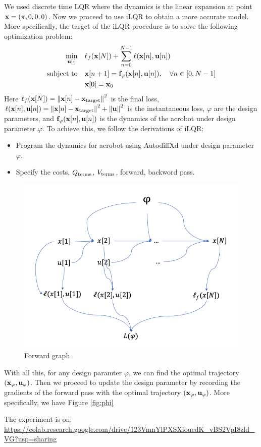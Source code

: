 \documentclass{article}
\begin{document}
We used discrete time LQR where the dynamics is the linear expansion at point $\mathbf{x} = (\pi,0,0,0)$. Now we proceed to use iLQR to obtain a more accurate model. More specifically, the target of the iLQR procedure is to solve the following optimization problem:
\begin{align*} \min_{\mathbf{u}[\cdot]} \quad & \ell_f(\mathbf{x}[N]) +
    \sum_{n=0}^{N-1} \ell(\mathbf{x}[n],\mathbf{u}[n]) \\ \text{subject to} \quad & \mathbf{x}[n+1] = {\bf
    f_\varphi}(\mathbf{x}[n], \mathbf{u}[n]), \quad \forall n\in[0, N-1] \\ & \mathbf{x}[0] = \mathbf{x}_0
\end{align*}
Here $\ell_f(\mathbf{x}[N]) = \left\|{\mathbf{x}[n] - \mathbf{x}_{\rm target}}\right\|^2$ is the final loss, $\ell(\mathbf{x}[n],\mathbf{u}[n]) = \left\|{\mathbf{x}[n] - \mathbf{x}_{\rm target}}\right\|^2 + \left\|{\mathbf{u}}\right\|^2$ is the instantaneous loss, $\varphi$ are the design parameters, and $\mathbf{f}_\varphi(\mathbf{x}[n],\mathbf{u}[n])$ is the dynamics of the acrobot under design parameter $\varphi$. To achieve this, we follow the derivations of iLQR:
\begin{itemize}
    \setlength{\itemsep}{0pt}
    \setlength{\parsep}{0pt}
    \setlength{\parskip}{0pt}
    \item Program the dynamics for acrobot using AutodiffXd under design parameter $\varphi$.
    \item Specify the costs, $Q_{\rm terms}$, $V_{\rm terms}$, forward, backword pass.
\end{itemize}
\begin{figure}[H]
\label{fig:phi}
\centering
\includegraphics[width=.5\textwidth]{forward_phi.png}
\caption{Forward graph}
\label{}
\end{figure}
With all this, for any design paramter $\varphi$, we can find the optimal trajectory $(\mathbf{x}_\varphi,\mathbf{u}_\varphi)$. Then we proceed to update the design parameter by recording the gradients of the forward pass with the optimal trajectory $(\mathbf{x}_\varphi,\mathbf{u}_\varphi)$. More specifically, we have Figure \ref{fig:phi}

The experiment is on: \url{https://colab.research.google.com/drive/123VmnYlPXSXiouedK_vBS2VpI8zld_VG?usp=sharing}


 


\end{document}
